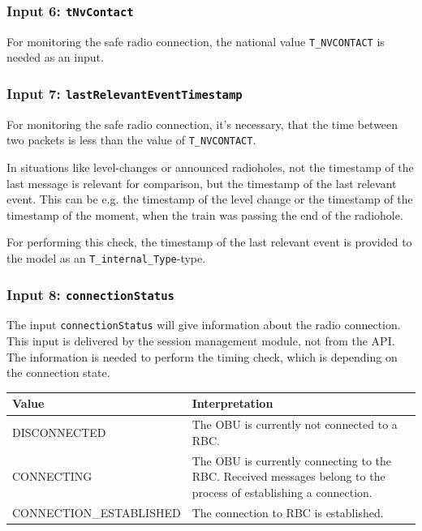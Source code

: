\subsubsection{Input 6: \texttt{tNvContact}}
For monitoring the safe radio connection, the national value \texttt{T\_NVCONTACT} is needed as an input.

\subsubsection{Input 7: \texttt{lastRelevantEventTimestamp}}
For monitoring the safe radio connection, it's necessary, that the time between two packets is less than the value of \texttt{T\_NVCONTACT}.

In situations like level-changes or announced radioholes, not the timestamp of the last message is relevant for comparison, but the timestamp of the last relevant event. This can be e.g. the timestamp of the level change or the timestamp of the timestamp of the moment, when the train was passing the end of the radiohole. 

For performing this check, the timestamp of the last relevant event is provided to the model as an \texttt{T\_internal\_Type}-type.

\subsubsection{Input 8: \texttt{connectionStatus}}
The input \texttt{connectionStatus} will give information about the radio connection. This input is delivered by the session management module, not from the API. The information is needed to perform the timing check, which is depending on the connection state.

\begin{minipage}{\linewidth}
\scriptsize
  \begin{tabular}{| l | p{9cm} |}
    \hline
    \textbf{Value} & \textbf{Interpretation}\\ \hline
    DISCONNECTED & The OBU is currently not connected to a RBC.\\
    CONNECTING & The OBU is currently connecting to the RBC. Received messages belong to the process of establishing a connection.\\
    CONNECTION\_ESTABLISHED &  The connection to RBC is established.\\
    \hline
  \end{tabular} 
  \label{tbl:connectionStatus}
\end{minipage}

